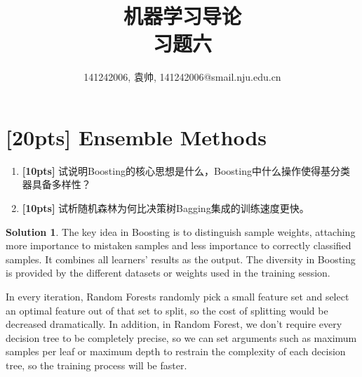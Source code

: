 \documentclass[a4paper,UTF8]{article}
\numberwithin{equation}{section}
\theoremstyle{definition}
\newtheorem*{solution}{Solution}
\begin{document}
\title{机器学习导论\\
习题六}
\author{141242006, 袁帅, 141242006@smail.nju.edu.cn}
\maketitle

\section{[20pts] Ensemble Methods}
\begin{enumerate}[ {(}1{)}]
\item \textbf{[10pts]} 试说明Boosting的核心思想是什么，Boosting中什么操作使得基分类器具备多样性？

\item \textbf{[10pts]} 试析随机森林为何比决策树Bagging集成的训练速度更快。
\end{enumerate}
\begin{solution}
\item[(1)] The key idea in Boosting is to distinguish sample weights, attaching more importance to mistaken samples and less importance to correctly classified samples. It combines all learners' results as the output. The diversity in Boosting is provided by the different datasets or weights used in the training session.
\item[(2)] In every iteration, Random Forests randomly pick a small feature set and select an optimal feature out of that set to split, so the cost of splitting would be decreased dramatically. In addition, in Random Forest, we don't require every decision tree to be completely precise, so we can set arguments such as maximum samples per leaf or maximum depth to restrain the complexity of each decision tree, so the training process will be faster.
~\\
\end{solution}
\end{document}
